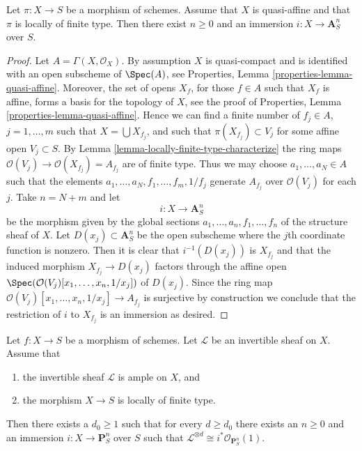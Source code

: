 \begin{lemma}
\label{lemma-quasi-affine-finite-type-over-S}
Let $\pi : X \to S$ be a morphism of schemes.
Assume that $X$ is quasi-affine and that $\pi$ is locally of finite type.
Then there exist $n \geq 0$ and an immersion $i : X \to \mathbf{A}^n_S$
over $S$.
\end{lemma}

\begin{proof}
Let $A = \Gamma(X, \mathcal{O}_X)$. By assumption $X$ is quasi-compact
and is identified with an open subscheme of $\Spec(A)$, see
Properties, Lemma \ref{properties-lemma-quasi-affine}.
Moreover, the set of opens $X_f$, for those $f \in A$ such that $X_f$ is
affine, forms a basis for the topology of $X$, see the proof of
Properties, Lemma \ref{properties-lemma-quasi-affine}.
Hence we can find a finite number of $f_j \in A$, $j = 1, \ldots, m$ such that
$X = \bigcup X_{f_j}$, and such that $\pi(X_{f_j}) \subset V_j$ for
some affine open $V_j \subset S$. By
Lemma \ref{lemma-locally-finite-type-characterize}
the ring maps $\mathcal{O}(V_j) \to \mathcal{O}(X_{f_j}) = A_{f_j}$
are of finite type. Thus we may choose $a_1, \ldots, a_N \in A$ such that
the elements $a_1, \ldots, a_N, f_1, \ldots, f_m, 1/f_j$ generate
$A_{f_j}$ over $\mathcal{O}(V_j)$ for each $j$. Take $n = N + m$ and
let
$$
i : X \longrightarrow \mathbf{A}^n_S
$$
be the morphism given by the global sections
$a_1, \ldots, a_n, f_1, \ldots, f_n$ of the structure sheaf of $X$.
Let $D(x_j) \subset \mathbf{A}^n_S$ be the open subscheme where the
$j$th coordinate function is nonzero.
Then it is clear that $i^{-1}(D(x_j))$ is $X_{f_j}$ and that
the induced morphism $X_{f_j} \to D(x_j)$ factors through the affine
open $\Spec(\mathcal{O}(V_j)[x_1, \ldots, x_n, 1/x_j])$
of $D(x_j)$. Since the ring map
$\mathcal{O}(V_j)[x_1, \ldots, x_n, 1/x_j] \to A_{f_j}$ is
surjective by construction we conclude that the restriction of $i$
to $X_{f_j}$ is an immersion as desired.
\end{proof}

\begin{lemma}
\label{lemma-quasi-projective-finite-type-over-S}
Let $f : X \to S$ be a morphism of schemes.
Let $\mathcal{L}$ be an invertible sheaf on $X$.
Assume that
\begin{enumerate}
\item the invertible sheaf $\mathcal{L}$ is ample on $X$, and
\item the morphism $X \to S$ is locally of finite type.
\end{enumerate}
Then there exists a $d_0 \geq 1$ such that for every $d \geq d_0$
there exists an $n \geq 0$ and an immersion
$i : X \to \mathbf{P}^n_S$ over $S$ such that
$\mathcal{L}^{\otimes d} \cong i^*\mathcal{O}_{\mathbf{P}^n_S}(1)$.
\end{lemma}

